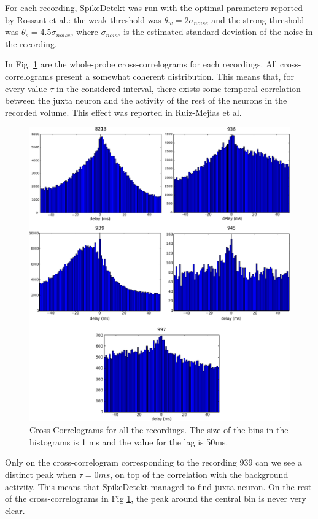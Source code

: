 \documentclass[10pt]{article}
\begin{document}
For each recording, SpikeDetekt was run with the optimal parameters reported by Rossant et al.: the weak threshold was $\theta_w = 2 \sigma_{noise}$ and the strong threshold was $\theta_s = 4.5 \sigma_{noise}$, where $\sigma_{noise}$ is the estimated standard deviation of the noise in the recording.

In Fig. \ref{fig:CC} are the whole-probe cross-correlograms for each recordings. All cross-correlograms present a somewhat coherent distribution. This means that, for every value $\tau$ in the considered interval, there exists some temporal correlation between the juxta neuron and the activity of the rest of the neurons in the recorded volume. This effect was reported in Ruiz-Mejias et al. \cite{ruiz2011slow}

\begin{figure}[!h]
\captionsetup{font=small}

	\centering
	\includegraphics[width=\linewidth]{2.Chapter/CC.pdf}
	\caption{Cross-Correlograms for all the recordings. The size of the bins in the histograms is 1 ms and the value for the lag is 50ms.
}
\label{fig:CC}
\end{figure}


Only on the cross-correlogram corresponding to the recording 939 can we see a distinct peak when $\tau=0 ms$, on top of the correlation with the background activity. This means that SpikeDetekt managed to find juxta neuron. On the rest of the cross-correlograms in Fig \ref{fig:CC}, the peak around the central bin is never very clear.
\end{document}
